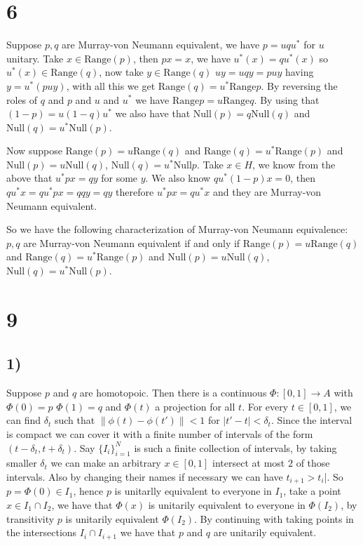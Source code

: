 \documentclass{article}
\begin{document}
\section*{6}

Suppose $p,q$ are Murray-von Neumann equivalent, we have $p=uqu^\ast$ for $u$ unitary. Take $x\in\text{Range}(p)$, then $px=x$,
we have $u^\ast(x)=qu^\ast(x)$ so $u^\ast(x)\in \text{Range}(q)$, now take $y\in \text{Range}(q)$ 
$uy=uqy=puy$ having $y=u^\ast(puy)$, with all this we get $\text{Range}(q)=u^\ast \text{Range}p$.
By reversing the roles of $q$ and $p$ and $u$ and $u^\ast$ we have $\text{Range}p=
u\text{Range}q$. By using that $(1-p)=u(1-q)u^\ast$ we also have that $\text{Null} (p)=q\text{Null}(q)$
and $\text{Null}(q)=u^\ast\text{Null}(p)$. 


Now suppose $\text{Range}(p)=u\text{Range}(q)$ and $\text{Range}(q)=u^\ast \text{Range}(p)$ 
and $\text{Null}(p)=u\text{Null}(q)$, $\text{Null}(q)=u^\ast\text{Null}{p}$.
Take $x\in H$, we know from the above that $u^\ast px=qy$ for some $y$. We also know 
$qu^\ast(1-p)x=0$, then $qu^\ast x=qu^\ast px=qqy=qy$ therefore $u^\ast px=qu^\ast x$ and they 
are Murray-von Neumann equivalent.


So we have the following characterization of Murray-von Neumann equivalence: $p,q$ are 
Murray-von Neumann equivalent if and only if $\text{Range}(p)=u\text{Range}(q)$ and $\text{Range}(q)=u^\ast \text{Range}(p)$ 
and $\text{Null}(p)=u\text{Null}(q)$, $\text{Null}(q)=u^\ast\text{Null}(p)$.



\section*{9}
\subsection*{1)}
Suppose $p$ and $q$ are homotopoic. Then there is a continuous $\Phi:[0,1]\to A$ with $\Phi(0)=p$
$\Phi(1)=q$ and $\Phi(t)$ a projection for all $t$. For every $t\in [0,1]$, we can find $\delta_t$
such that $\|\phi(t)-\phi(t')\|<1$ for $|t'-t|<\delta_t$. Since the interval is compact
we can cover it with a finite number of intervals of the form $(t-\delta_t,t+\delta_t)$. 
Say $\{I_i\}_{i=1}^{N}$ is such a finite collection of intervals, by taking smaller $\delta_t$
we can make an arbitrary $x\in [0,1]$ intersect at most $2$ of those intervals. Also by
changing their names if necessary we can have $t_{i+1}>t_i$|. So $p=\Phi(0)\in I_1$, hence
$p$ is unitarlly equivalent to everyone in $I_1$, take a point $x\in I_1\cap I_2$, we have 
that $\Phi(x)$ is unitarily equivalent to everyone in $\Phi(I_2)$, by transitivity $p$ is 
unitarily equivalent $\Phi(I_2)$. By continuing with taking points in the intersections 
$I_i\cap I_{i+1}$ we have that $p$ and $q$ are unitarily equivalent.  
\end{document}
